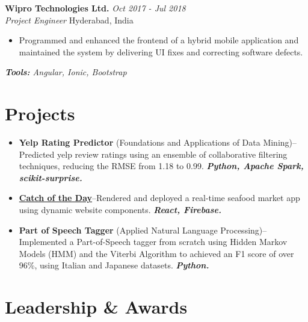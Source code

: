 \documentclass[letterpaper,10pt]{article}
\newcommand{\organization}[4]{
    \vspace{1.5pt}
    \textbf{#1} \hfill{\emph{#2}} \\
    \emph{#3} \hfill{#4} \\
    \vspace{3pt}
}
\newcommand{\toolsused}[1]{
    \vspace{1.5pt}
    \emph{#1}\\
    \vspace{3pt}
}
\newcommand{\pro}[4]{
    \item \textbf{#1} {#2}--{#3} \textbf{\textit{#4}}
}
\newcommand{\prowlink}[4]{
    \item \href{#2}{\textbf{#1}}--{#3} \textbf{\textit{#4}}
}
\newcommand{\bulletsBegin}{
    \vspace{1pt}
    \begin{minipage}{17.6cm}
    \begin{itemize}[leftmargin=0.6cm]
    \setlength\itemsep{-0.1em}
}
\newcommand{\bulletsEnd}{
    \end{itemize}\vspace{0pt}
    \end{minipage}
}
\begin{document}
        \organization{Wipro Technologies Ltd.}{Oct 2017 - Jul 2018}
        {Project Engineer}{Hyderabad, India}
        \bulletsBegin
		\item Programmed and enhanced the frontend of a hybrid mobile application and maintained the system by delivering UI fixes and correcting software defects.
            \vspace{-2pt}
        \bulletsEnd
	\vspace{-7pt}
        \toolsused{\textbf{Tools:} Angular, Ionic, Bootstrap}
	\vspace{5pt}

    \section{Projects}

    
        \bulletsBegin
            \vspace{-3pt}
        \pro{Yelp Rating Predictor}{(Foundations and Applications of Data Mining)}
            {Predicted yelp review ratings using an ensemble of collaborative filtering techniques, reducing the RMSE from 1.18 to 0.99.}
            {Python, Apache Spark, scikit-surprise.}
        \prowlink
		 {Catch of the Day}{https://divyanshi26.github.io/divy-catch-of-the-day/}
            {Rendered and deployed a real-time seafood market app using dynamic website components.}
            {React, Firebase.}
        \pro{Part of Speech Tagger}{(Applied Natural Language Processing)}
            {Implemented a Part-of-Speech tagger from scratch using Hidden Markov Models (HMM) and the Viterbi Algorithm to achieved an F1 score of over 96\%, using Italian and Japanese datasets.}
            {Python.}
        
        \bulletsEnd

    
    \section{Leadership \& Awards}
\end{document}

